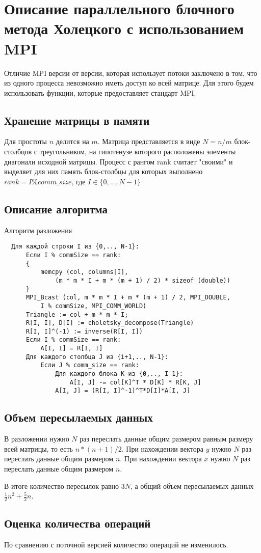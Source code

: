 \documentclass[a4paper, 12pt]{article}
\begin{document}
\section{Описание параллельного блочного метода Холецкого с использованием
  MPI}
Отличие MPI версии от версии, которая использует потоки
заключено в том, что из одного процесса невозможно иметь доступ
ко всей матрице. Для этого будем использовать функции, которые
предоставляет стандарт MPI.
\subsection{Хранение матрицы в памяти}
Для простоты $n$ делится на $m$. Матрица представляется в виде 
$N=n/m$ блок-столбцов с треугольником, на гипотенузе которого расположены 
элементы диагонали исходной матрицы.
Процесс с рангом rank считает "своими" и выделяет для них память
блок-столбцы для которых выполнено 
$rank = I \% comm\_size$, где $I \in \{0,...,N-1\}$
\subsection{Описание алгоритма}
Алгоритм разложения
\begin{verbatim}
  Для каждой строки I из {0,.., N-1}:
      Если I % commSize == rank:
      {
          memcpy (col, columns[I], 
              (m * m * I + m * (m + 1) / 2) * sizeof (double))
      }
      MPI_Bcast (col, m * m * I + m * (m + 1) / 2, MPI_DOUBLE,
          I % commSize, MPI_COMM_WORLD)
      Triangle := col + m * m * I;
      R[I, I], D[I] := choletsky_decompose(Triangle)
      R[I, I]^(-1) := inverse(R[I, I])
      Если I % commSize == rank:
          A[I, I] = R[I, I]
      Для каждого столбца J из {i+1,.., N-1}:
          Если J % comm_size == rank:
              Для каждого блока K из {0,.., I-1}:
                  A[I, J] -= col[K]^T * D[K] * R[K, J]
              A[I, J] = (R[I, I]^-1)^T*D[I]*A[I, J]
\end{verbatim}
\subsection{Объем пересылаемых данных}
В разложении нужно $N$ раз переслать данные общим размером равным
размеру всей матрицы, то есть $n*(n+1)/2$.
При нахождении вектора $y$ нужно $N$ раз переслать данные общим размером
$n$.
При нахождении вектора $x$ нужно $N$ раз переслать данные общим размером
$n$.

В итоге количество пересылок равно $3N$, а общий объем 
пересылаемых данных $\frac{1}{2}n^2 + \frac{5}{2}n$.
\subsection{Оценка количества операций}
По сравнению с поточной версией количество операций не изменилось.
\end{document}
